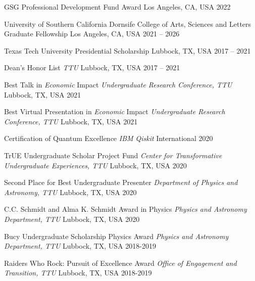 

\begin{cvhonors}

    \cvhonor
    {GSG Professional Development Fund Award}
    {}
    {Los Angeles, CA, USA}
    {2022}

    \cvhonor
    {University of Southern California Dornsife College of Arts, Sciences and Letters Graduate Fellowship}
    {}
    {Los Angeles, CA, USA}
    {2021 -- 2026}

    \cvhonor
    {Texas Tech University Presidential Scholarship}
    {}
    {Lubbock, TX, USA}
    {2017 -- 2021}

    \cvhonor
    {Dean's Honor List}
    {\textit{\scriptsize TTU}}
    {Lubbock, TX, USA}
    {2017 -- 2021}

    \cvhonor
    {Best Talk in \textit{Economic} Impact}
    {\textit{\scriptsize Undergraduate Research Conference, TTU}}
    {Lubbock, TX, USA}
    {2021}

    \cvhonor
    {Best Virtual Presentation in \textit{Economic} Impact}
    {\textit{\scriptsize Undergraduate Research Conference, TTU}}
    {Lubbock, TX, USA}
    {2021}

    \cvhonor
    {Certification of Quantum Excellence}
    {\textit{\scriptsize IBM Qiskit}}
    {International}
    {2020}

    \cvhonor
    {TrUE Undergraduate Scholar Project Fund}
    {\textit{\scriptsize Center for Transformative Undergraduate Experiences, TTU}}
    {Lubbock, TX, USA}
    {2020}

    \cvhonor
    {Second Place for Best Undergraduate Presenter}
    {\textit{\scriptsize Department of Physics and Astronomy, TTU}}
    {Lubbock, TX, USA}
    {2020}

    \cvhonor
    {C.C. Schmidt and Alma K. Schmidt Award in Physics}
    {\textit{\scriptsize Physics and Astronomy Department, TTU}}
    {Lubbock, TX, USA}
    {2020}

    \cvhonor
    {Bucy Undergraduate Scholarship Physics Award}
    {\textit{\scriptsize Physics and Astronomy Department, TTU}}
    {Lubbock, TX, USA}
    {2018-2019}

    \cvhonor
    {Raiders Who Rock:  Pursuit of Excellence Award}
    {\textit{\scriptsize Office of Engagement and Transition, TTU}}
    {Lubbock, TX, USA}
    {2018-2019}


\end{cvhonors}
